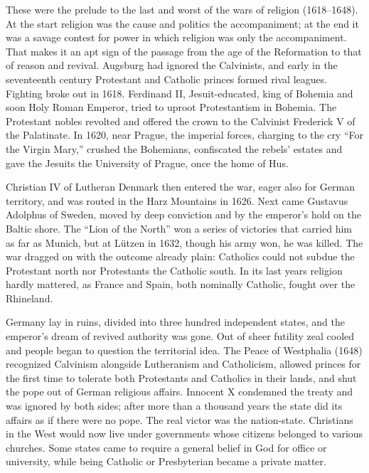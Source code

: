 These were the prelude to the last and worst of the wars of religion (1618--1648). At the start religion was the cause and politics the accompaniment; at the end it was a savage contest for power in which religion was only the accompaniment. That makes it an apt sign of the passage from the age of the Reformation to that of reason and revival. Augsburg had ignored the Calvinists, and early in the seventeenth
century Protestant and Catholic princes formed rival leagues. Fighting broke out in 1618. Ferdinand
II, Jesuit-educated, king of Bohemia and soon Holy Roman Emperor, tried to uproot Protestantism in
Bohemia. The Protestant nobles revolted and offered the crown to the Calvinist Frederick V of the
Palatinate. In 1620, near Prague, the imperial forces, charging to the cry ``For the Virgin Mary,''
crushed the Bohemians, confiscated the rebels' estates and gave the Jesuits the University of Prague,
once the home of Hus.

Christian IV of Lutheran Denmark then entered the war, eager also for German territory, and was
routed in the Harz Mountains in 1626. Next came Gustavus Adolphus of Sweden, moved by deep conviction
and by the emperor's hold on the Baltic shore. The ``Lion of the North'' won a series of victories
that carried him as far as Munich, but at L\"utzen in 1632, though his army won, he was killed. The
war dragged on with the outcome already plain: Catholics could not subdue the Protestant north nor
Protestants the Catholic south. In its last years religion hardly mattered, as France and Spain, both
nominally Catholic, fought over the Rhineland.

Germany lay in ruins, divided into three hundred independent states, and the emperor's dream of
revived authority was gone. Out of sheer futility zeal cooled and people began to question the
territorial idea. The Peace of Westphalia (1648) recognized Calvinism alongside Lutheranism and
Catholicism, allowed princes for the first time to tolerate both Protestants and Catholics in their
lands, and shut the pope out of German religious affairs. Innocent X condemned the treaty and was
ignored by both sides; after more than a thousand years the state did its affairs as if there were no pope. The real victor was the nation-state. Christians in the West would now live under
governments whose citizens belonged to various churches. Some states came to require a general
belief in God for office or university, while being Catholic or Presbyterian became a private matter.

